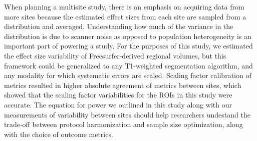 When planning a multisite study, there is an emphasis on acquiring data from more sites because the estimated effect sizes from each site are sampled from a distribution and averaged. Understanding how much of the variance in the distribution is due to scanner noise as opposed to population heterogeneity is an important part of powering a study. For the purposes of this study, we estimated the effect size variability of Freesurfer-derived regional volumes, but this framework could be generalized to any T1-weighted segmentation algorithm, and any modality for which systematic errors are scaled. Scaling factor calibration of metrics resulted in higher absolute agreement of metrics between sites, which showed that the scaling factor variabilities for the ROIs in this study were accurate. The equation for power we outlined in this study along with our measurements of variability between sites should help researchers undestand the trade-off between protocol harmonization and sample size optimization, along with the choice of outcome metrics. %